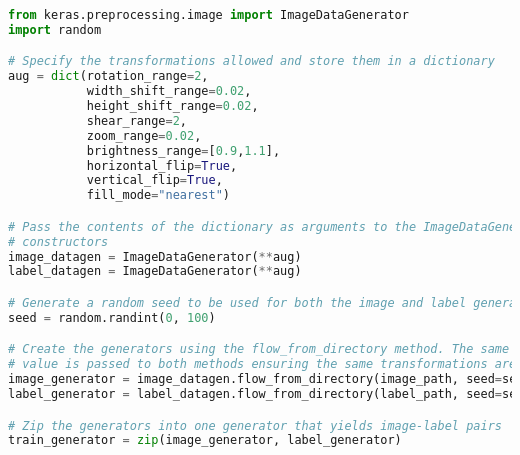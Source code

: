 \begin{lstlisting}[float={ht},caption={A simplified example of online augmentation implemented using the Keras \texttt{ImageDataGenerator} class.},label={lst:augment},language=Python,upquote=true]
from keras.preprocessing.image import ImageDataGenerator
import random

# Specify the transformations allowed and store them in a dictionary
aug = dict(rotation_range=2,
           width_shift_range=0.02,
           height_shift_range=0.02,
           shear_range=2,
           zoom_range=0.02,
           brightness_range=[0.9,1.1],
           horizontal_flip=True,
           vertical_flip=True,
           fill_mode="nearest")

# Pass the contents of the dictionary as arguments to the ImageDataGenerator
# constructors
image_datagen = ImageDataGenerator(**aug)
label_datagen = ImageDataGenerator(**aug)

# Generate a random seed to be used for both the image and label generators
seed = random.randint(0, 100)

# Create the generators using the flow_from_directory method. The same seed
# value is passed to both methods ensuring the same transformations are applied.
image_generator = image_datagen.flow_from_directory(image_path, seed=seed, ...)
label_generator = label_datagen.flow_from_directory(label_path, seed=seed, ...)

# Zip the generators into one generator that yields image-label pairs
train_generator = zip(image_generator, label_generator)
\end{lstlisting}